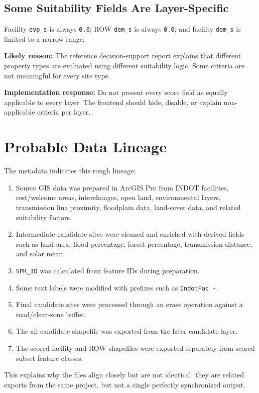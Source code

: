 \documentclass[11pt]{article}
\newcommand{\code}[1]{\nolinkurl{#1}}
\begin{document}
\subsection{Some Suitability Fields Are Layer-Specific}

Facility \code{evp_s} is always \code{0.0}; ROW \code{dem_s} is always \code{0.0}; and
facility \code{dem_s} is limited to a narrow range.

\textbf{Likely reason:} The reference decision-support report explains that different
property types are evaluated using different suitability logic. Some criteria are
not meaningful for every site type.

\textbf{Implementation response:} Do not present every score field as equally
applicable to every layer. The frontend should hide, disable, or explain
non-applicable criteria per layer.

\section{Probable Data Lineage}

The metadata indicates this rough lineage:

\begin{enumerate}
  \item Source GIS data was prepared in ArcGIS Pro from INDOT facilities, rest/welcome areas, interchanges, open land, environmental layers, transmission line proximity, floodplain data, land-cover data, and related suitability factors.
  \item Intermediate candidate sites were cleaned and enriched with derived fields such as land area, flood percentage, forest percentage, transmission distance, and solar mean.
  \item \code{SPR_ID} was calculated from feature IDs during preparation.
  \item Some text labels were modified with prefixes such as \code{IndotFac -}.
  \item Final candidate sites were processed through an erase operation against a road/clear-zone buffer.
  \item The all-candidate shapefile was exported from the later candidate layer.
  \item The scored facility and ROW shapefiles were exported separately from scored subset feature classes.
\end{enumerate}

This explains why the files align closely but are not identical: they are related
exports from the same project, but not a single perfectly synchronized output.
\end{document}
